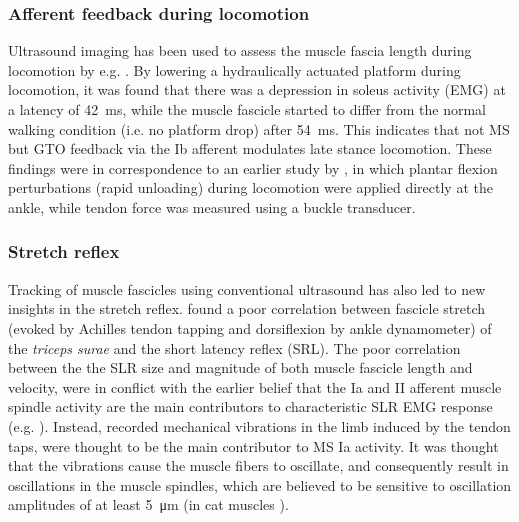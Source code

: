 \subsubsection{Afferent feedback during locomotion}
Ultrasound imaging has been used to assess the muscle fascia length during locomotion by e.g. \citet{klint_afferent_2009}. By lowering a hydraulically actuated platform during locomotion, it was found that there was a depression in soleus activity (EMG) at a latency of \SI{42}{\milli\second}, while the muscle fascicle started to differ from the normal walking condition (i.e. no platform drop) after \SI{54}{\milli\second}. This indicates that not MS but GTO feedback via the Ib afferent modulates late stance locomotion. These findings were in correspondence to an earlier study by \citet{grey_positive_2007}, in which plantar flexion perturbations (rapid unloading) during locomotion were applied directly at the ankle, while tendon force was measured using a buckle transducer. 


\subsubsection{Stretch reflex}
Tracking of muscle fascicles using conventional ultrasound has also led to new insights in the stretch reflex. \citet{cronin_triceps_2015} found a poor correlation between fascicle stretch (evoked by Achilles tendon tapping and dorsiflexion by ankle dynamometer) of the \textit{triceps surae} and the short latency reflex (SRL). The poor correlation between the the SLR size and magnitude of both muscle fascicle length and velocity, were in conflict with the earlier belief that the Ia and II afferent muscle spindle activity are the main contributors to characteristic SLR EMG response (e.g. \cite{schuurmans_monosynaptic_2009}). Instead, recorded mechanical vibrations in the limb induced by the tendon taps, were thought to be the main contributor to MS Ia activity. It was thought that the vibrations cause the muscle fibers to oscillate, and consequently result in oscillations in the muscle spindles, which are believed to be sensitive to oscillation amplitudes of at least \SI{5}{\micro\meter} (in cat muscles \cite{brown_relative_1967}). 


